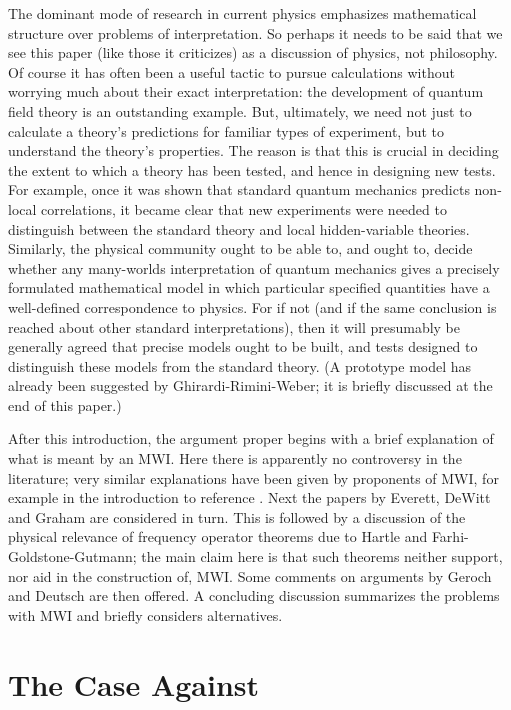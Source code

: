 \documentclass[aps,pra,12pt]{revtex4}
\begin{document}
The dominant mode of research in current physics emphasizes mathematical
structure over problems of interpretation. 
So perhaps it needs to be said that we see this paper (like those it 
criticizes) as a discussion of physics, not philosophy. 
Of course it has often been a useful tactic to pursue calculations without
worrying much about their exact interpretation: the development of quantum
field theory is an outstanding example.
But, ultimately, we need not just to calculate a theory's predictions for 
familiar types of experiment, but to understand the theory's properties. 
The reason is that this is crucial in deciding the 
extent to which a theory has 
been tested, and hence in designing new tests.  
For example, once it was shown that standard quantum mechanics predicts 
non-local correlations,\cite{bell0} it became clear that new experiments
were needed to distinguish between the standard theory and local 
hidden-variable theories. 
Similarly, the physical community ought to be able to, and ought to, 
decide whether any many-worlds interpretation of quantum mechanics gives a 
precisely formulated mathematical model in which particular specified 
quantities have a well-defined correspondence to physics. 
For if not (and if the same conclusion is reached about other standard
interpretations), then it will presumably be generally agreed that 
precise models ought to be built, and tests designed
to distinguish these models from the standard theory. 
(A prototype model has already been 
suggested by Ghirardi-Rimini-Weber;\cite{grw} it is 
briefly discussed at the end of this paper.) 

After this introduction, the argument proper begins with a brief
explanation of what is meant by an MWI.  Here there is apparently no
controversy in the literature; very similar explanations have been
given by proponents of MWI, for example in the introduction to
reference \cite{dew}.  Next the papers by Everett, DeWitt and Graham
are considered in turn.  This is followed by a discussion of the
physical relevance of frequency operator theorems due to Hartle and
Farhi-Goldstone-Gutmann; the main claim here is that such theorems
neither support, nor aid in the construction of, MWI.  Some comments
on arguments by Geroch and Deutsch are then offered.  A concluding
discussion summarizes the problems with MWI and briefly considers
alternatives.

\section{The Case Against}
\end{document}
